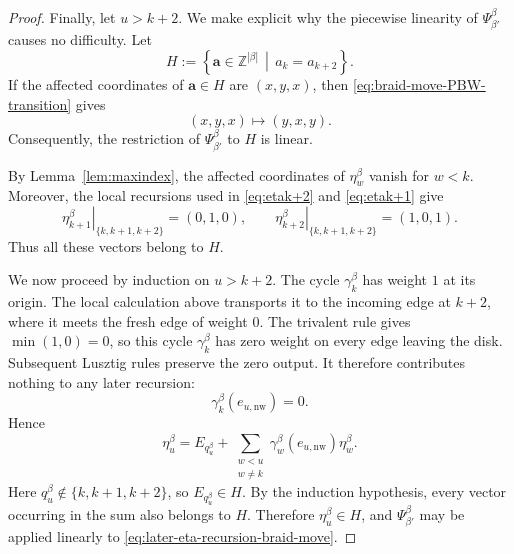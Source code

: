 \documentclass[12pt, reqno]{amsart}
\theoremstyle{plain}
\theoremstyle{definition}
\numberwithin{equation}{section}
\newcommand{\ZZ}{\mathbb{Z}}
\newcommand{\w}{\operatorname{W}}
\begin{document}
\begin{proof}
Finally, let \(u>k+2\). We make explicit why the piecewise
linearity of \(\Psi_{\beta'}^\beta\) causes no difficulty. Let
\[
    H
    :=
    \left\{
        \mathbf a\in\ZZ^{|\beta|}
        \,\middle|\,
        a_k=a_{k+2}
    \right\}.
\]
If the affected coordinates of \(\mathbf a\in H\) are
\((x,y,x)\), then
\eqref{eq:braid-move-PBW-transition} gives
\[
    (x,y,x)\longmapsto(y,x,y).
\]
Consequently, the restriction of
\(\Psi_{\beta'}^\beta\) to \(H\) is linear.

By Lemma~\ref{lem:maxindex}, the affected coordinates of
\(\eta_w^\beta\) vanish for \(w<k\). Moreover, the local recursions
used in \eqref{eq:etak+2} and \eqref{eq:etak+1} give
\[
    \left.\eta_{k+1}^\beta\right|_{\{k,k+1,k+2\}}
    =(0,1,0),
    \qquad
    \left.\eta_{k+2}^\beta\right|_{\{k,k+1,k+2\}}
    =(1,0,1).
\]
Thus all these vectors belong to \(H\).

We now proceed by induction on \(u>k+2\). The cycle
\(\gamma^\beta_k\) has weight \(1\) at its origin. The local calculation above
transports it to the incoming edge at \(k+2\), where it meets
the fresh edge of weight \(0\). The trivalent rule gives
\(\min(1,0)=0\), so this cycle $\gamma^\beta_{k}$ has zero weight on every edge
leaving the disk. Subsequent Lusztig rules preserve the zero
output. It therefore contributes nothing to any later recursion:
\[
    \gamma_k^\beta(e_{u,\mathrm{nw}})=0.
\]
Hence
\begin{equation}\label{eq:later-eta-recursion-braid-move}
    \eta_u^\beta
    =
    E_{q_u^\beta}
    +
    \sum_{\substack{w<u\\w\neq k}}
        \gamma_w^\beta(e_{u,\mathrm{nw}})
        \eta_w^\beta.
\end{equation}
Here \(q_u^\beta\notin\{k,k+1,k+2\}\), so
\(E_{q_u^\beta}\in H\). By the induction hypothesis, every vector
occurring in the sum also belongs to \(H\). Therefore
\(\eta_u^\beta\in H\), and
\(\Psi_{\beta'}^\beta\) may be applied linearly to
\eqref{eq:later-eta-recursion-braid-move}.


\end{proof}
\end{document}
